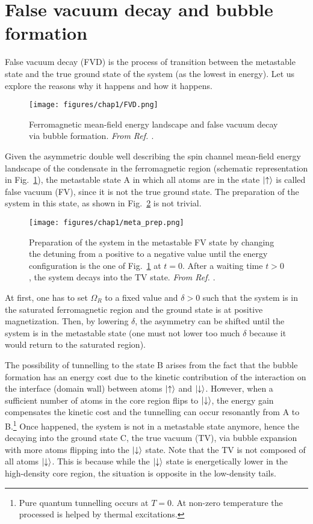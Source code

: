 \section{False vacuum decay and bubble formation}
False vacuum decay (FVD) is the process of transition between the metastable state and the true ground state of the system (as the lowest in energy). Let us explore the reasons why it happens and how it happens.

\begin{figure}[ht!]
    \centering
    \texttt{[image: figures/chap1/FVD.png]}
    \caption{Ferromagnetic mean-field energy landscape and false vacuum decay via bubble formation. \textit{From Ref. \cite{zenesini2024false}}.}
    \label{fig:FVD}
\end{figure}

Given the asymmetric double well describing the spin channel mean-field energy landscape of the condensate in the ferromagnetic region (schematic representation in Fig.\ \ref{fig:FVD}), the metastable state A in which all atoms are in the state $\ket{\uparrow}$ is called false vacuum (FV), since it is not the true ground state. The preparation of the system  in this state, as shown in Fig.\ \ref{fig:meta_prep} is not trivial. 
\begin{figure}[ht!]
    \centering
    \texttt{[image: figures/chap1/meta\_prep.png]}
    \caption{Preparation of the system in the metastable FV state by changing the detuning from a positive to a negative value until the energy configuration is the one of Fig.\ \ref{fig:FVD} at $t = 0$. After a waiting time $t > 0$, the system decays into the TV state. \textit{From Ref. \cite{zenesini2024false}}.}
    \label{fig:meta_prep}
\end{figure}
At first, one has to set $\Omega_R$ to a fixed value and $\delta > 0$ such that the system is in the saturated ferromagnetic region and the ground state is at positive magnetization. Then, by lowering $\delta$, the asymmetry can be shifted until the system is in the metastable state (one must not lower too much $\delta$ because it would return to the saturated region). 

The possibility of tunnelling to the state B arises from the fact that the bubble formation has an energy cost due to the kinetic contribution of the interaction on the interface (domain wall) between atoms $\ket{\uparrow}$ and $\ket{\downarrow}$. However, when a sufficient number of atoms in the core region flips to $\ket{\downarrow}$, the energy gain compensates the kinetic cost and the tunnelling can occur resonantly from A to B.\footnote{Pure quantum tunnelling occurs at $T = 0$. At non-zero temperature the processed is helped by thermal excitations.} Once happened, the system is not in a metastable state anymore, hence the decaying into the ground state C, the true vacuum (TV), via bubble expansion with more atoms flipping into the $\ket{\downarrow}$ state. Note that the TV is not composed of all atoms $\ket{\downarrow}$. This is because while the $\ket{\downarrow}$ state is energetically lower in the high-density core region, the situation is opposite in the low-density tails.

